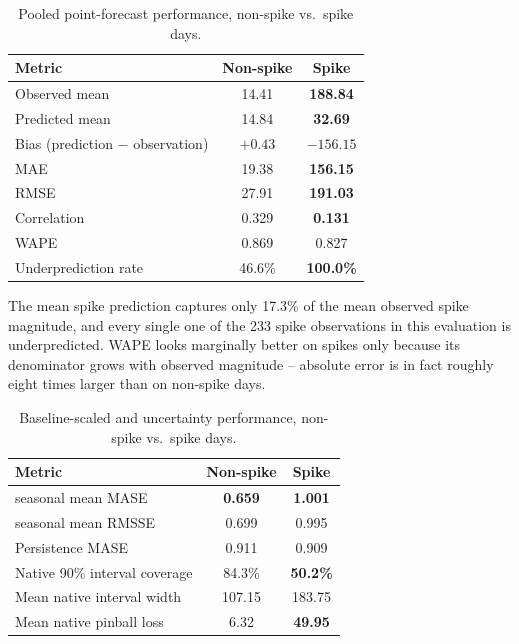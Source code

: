 \begin{table}[htbp]
\centering
\footnotesize
\begin{tabular}{lcc}
\toprule
Metric & Non-spike & Spike \\
\midrule
Observed mean & 14.41 & \textbf{188.84} \\
Predicted mean & 14.84 & \textbf{32.69} \\
Bias (prediction $-$ observation) & $+0.43$ & \textbf{$-156.15$} \\
MAE & 19.38 & \textbf{156.15} \\
RMSE & 27.91 & \textbf{191.03} \\
Correlation & 0.329 & \textbf{0.131} \\
WAPE & 0.869 & 0.827 \\
Underprediction rate & 46.6\% & \textbf{100.0\%} \\
\bottomrule
\end{tabular}
\caption{Pooled point-forecast performance, non-spike vs.\ spike days.}
\end{table}

The mean spike prediction captures only 17.3\% of the mean observed spike magnitude, and every
single one of the 233 spike observations in this evaluation is underpredicted. WAPE looks
marginally better on spikes only because its denominator grows with observed magnitude -- absolute
error is in fact roughly eight times larger than on non-spike days.

\begin{table}[htbp]
\centering
\footnotesize
\begin{tabular}{lcc}
\toprule
Metric & Non-spike & Spike \\
\midrule
seasonal mean MASE & \textbf{0.659} & \textbf{1.001} \\
seasonal mean RMSSE & 0.699 & 0.995 \\
Persistence MASE & 0.911 & 0.909 \\
Native 90\% interval coverage & 84.3\% & \textbf{50.2\%} \\
Mean native interval width & 107.15 & 183.75 \\
Mean native pinball loss & 6.32 & \textbf{49.95} \\
\bottomrule
\end{tabular}
\caption{Baseline-scaled and uncertainty performance, non-spike vs.\ spike days.}
\end{table}

